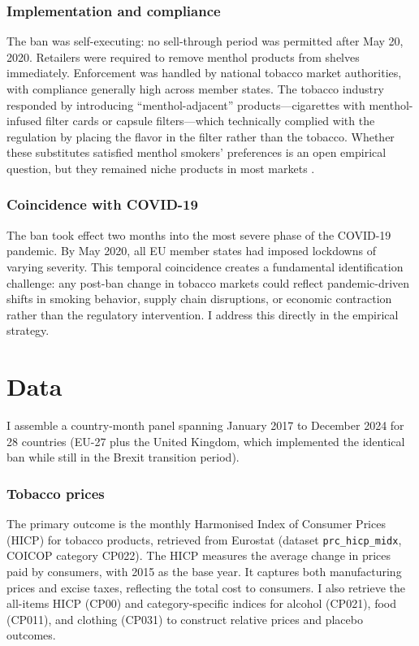\documentclass[12pt]{article}
\begin{document}
\subsubsection*{Implementation and compliance} The ban was self-executing: no sell-through period was permitted after May 20, 2020. Retailers were required to remove menthol products from shelves immediately. Enforcement was handled by national tobacco market authorities, with compliance generally high across member states. The tobacco industry responded by introducing ``menthol-adjacent'' products---cigarettes with menthol-infused filter cards or capsule filters---which technically complied with the regulation by placing the flavor in the filter rather than the tobacco. Whether these substitutes satisfied menthol smokers' preferences is an open empirical question, but they remained niche products in most markets \citep{european2021implementation}.

\subsubsection*{Coincidence with COVID-19} The ban took effect two months into the most severe phase of the COVID-19 pandemic. By May 2020, all EU member states had imposed lockdowns of varying severity. This temporal coincidence creates a fundamental identification challenge: any post-ban change in tobacco markets could reflect pandemic-driven shifts in smoking behavior, supply chain disruptions, or economic contraction rather than the regulatory intervention. I address this directly in the empirical strategy.


\section{Data}

I assemble a country-month panel spanning January 2017 to December 2024 for 28 countries (EU-27 plus the United Kingdom, which implemented the identical ban while still in the Brexit transition period).

\subsubsection*{Tobacco prices} The primary outcome is the monthly Harmonised Index of Consumer Prices (HICP) for tobacco products, retrieved from Eurostat (dataset \texttt{prc\_hicp\_midx}, COICOP category CP022). The HICP measures the average change in prices paid by consumers, with 2015 as the base year. It captures both manufacturing prices and excise taxes, reflecting the total cost to consumers. I also retrieve the all-items HICP (CP00) and category-specific indices for alcohol (CP021), food (CP011), and clothing (CP031) to construct relative prices and placebo outcomes.
\end{document}
